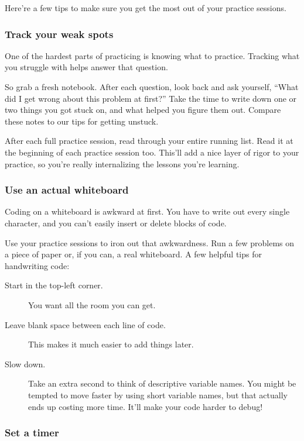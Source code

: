 \documentclass{article}
\begin{document}
Here’re a few tips to make sure you get the most out of your practice sessions.


\subsubsection{Track your weak spots}

One of the hardest parts of practicing is knowing what to practice. Tracking what you struggle with helps answer that question.

So grab a fresh notebook. After each question, look back and ask yourself, “What did I get wrong about this problem at first?” Take the time to write down one or two things you got stuck on, and what helped you figure them out. Compare these notes to our tips for getting unstuck.

After each full practice session, read through your entire running list. Read it at the beginning of each practice session too. This’ll add a nice layer of rigor to your practice, so you’re really internalizing the lessons you’re learning.

\subsubsection{Use an actual whiteboard}

Coding on a whiteboard is awkward at first. You have to write out every single character, and you can’t easily insert or delete blocks of code.

Use your practice sessions to iron out that awkwardness. Run a few problems on a piece of paper or, if you can, a real whiteboard. A few helpful tips for handwriting code:

\begin{description}
\item[Start in the top-left corner.] You want all the room you can get.
\item[Leave blank space between each line of code.] This makes it much easier to add things later.
\item[Slow down.] Take an extra second to think of descriptive variable names. You might be tempted to move faster by using short variable names, but that actually ends up costing more time. It’ll make your code harder to debug!
\end{description}



\subsubsection{Set a timer}
\end{document}
